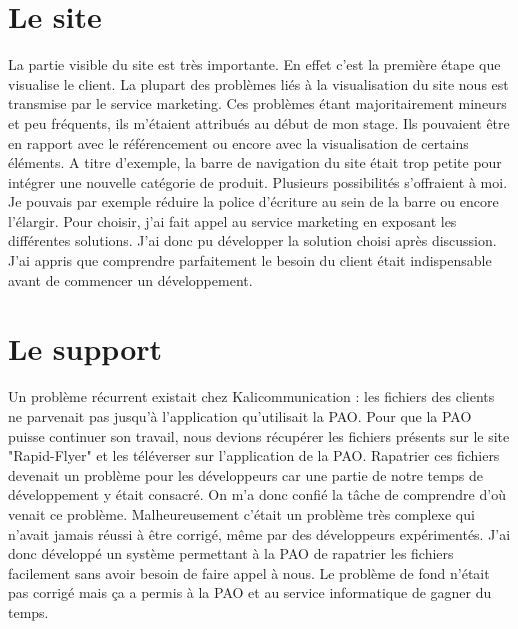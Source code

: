 
\section{Le site}
La partie visible du site est très importante. En effet c'est la première étape que visualise le client. La plupart des problèmes liés à la visualisation du site nous est transmise par le service marketing. Ces problèmes étant majoritairement mineurs et peu fréquents, ils m'étaient attribués au début de mon stage. Ils pouvaient être en rapport avec le référencement ou encore avec la visualisation de certains éléments.\newline
A titre d'exemple, la barre de navigation du site était trop petite pour intégrer une nouvelle catégorie de produit. Plusieurs possibilités s'offraient à moi. Je pouvais par exemple réduire la police d'écriture au sein de la barre ou encore l'élargir. Pour choisir, j'ai fait appel au service marketing en exposant les différentes solutions. J'ai donc pu développer la solution choisi après discussion.\newline
J'ai appris que comprendre parfaitement le besoin du client était indispensable avant de commencer un développement.

\section{Le support}
Un problème récurrent existait chez Kalicommunication : les fichiers des clients ne parvenait pas jusqu'à l'application qu'utilisait la PAO. Pour que la PAO puisse continuer son travail, nous devions récupérer les fichiers présents sur le site "Rapid-Flyer" et les téléverser sur l'application de la PAO.\newline
Rapatrier ces fichiers devenait un problème pour les développeurs car une partie de notre temps de développement y était consacré.\newline
On m'a donc confié la tâche de comprendre d'où venait ce problème. Malheureusement c'était un problème très complexe qui n'avait jamais réussi à être corrigé, même par des développeurs expérimentés. J'ai donc développé un système permettant à la PAO de rapatrier les fichiers facilement sans avoir besoin de faire appel à nous. Le problème de fond n'était pas corrigé mais ça a permis à la PAO et au service informatique de gagner du temps.

